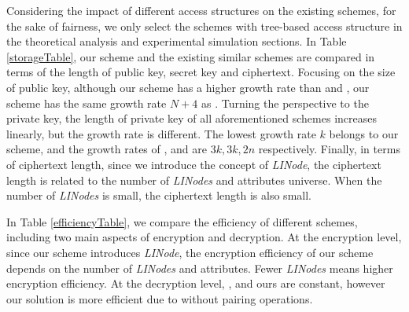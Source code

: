 \documentclass[smallextended]{svjour3}       %
\begin{document}
Considering the impact of different access structures on the existing schemes, for the sake of fairness, we only select the schemes with tree-based access structure in the theoretical analysis and experimental simulation sections.
In Table \ref{storageTable}, our scheme and the existing similar schemes are compared in terms of the length of public key, secret key and ciphertext.
Focusing on the size of public key, although our scheme has a higher growth rate than \cite{hur2013attribute} and \cite{helil2017cp}, our scheme has the same growth rate $N+4$ as \cite{muller2011hiding}.
Turning the perspective to the private key, the length of private key of all aforementioned schemes increases linearly, but the growth rate is different.
The lowest growth rate $k$ belongs to our scheme, and the growth rates of \cite{helil2017cp}, \cite{hur2013attribute} and \cite{muller2011hiding} are $3k, 3k, 2n$ respectively.
Finally, in terms of ciphertext length, since we introduce the concept of \textit{LINode}, the ciphertext length is related to the number of \textit{LINodes} and attributes universe.
When the number of \textit{LINodes} is small, the ciphertext length is also small.

In Table \ref{efficiencyTable}, we compare the efficiency of different schemes, including two main aspects of encryption and decryption.
At the encryption level, since our scheme introduces \textit{LINode}, the encryption efficiency of our scheme depends on the number of \textit{LINodes} and attributes. 
Fewer \textit{LINodes} means higher encryption efficiency.
At the decryption level, \cite{hur2013attribute}, \cite{helil2017cp} and ours are constant, however our solution is more efficient due to without pairing operations.
\end{document}
